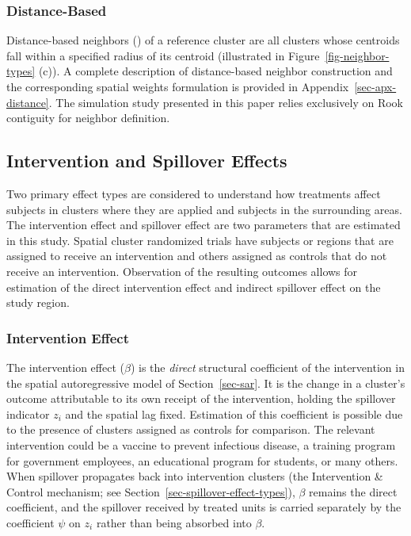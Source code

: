 \documentclass[
  12pt,
  prelim]{bios-prelim}
\begin{document}
\subsubsection{Distance-Based}\label{distance-based}

Distance-based neighbors
()
of a reference cluster are all clusters whose centroids fall within a
specified radius of its centroid (illustrated in
Figure~\ref{fig-neighbor-types} (c)). A complete description of
distance-based neighbor construction and the corresponding spatial
weights formulation is provided in Appendix~\ref{sec-apx-distance}. The
simulation study presented in this paper relies exclusively on Rook
contiguity for neighbor definition.

\subsection{Intervention and Spillover
Effects}\label{intervention-and-spillover-effects}

Two primary effect types are considered to understand how treatments
affect subjects in clusters where they are applied and subjects in the
surrounding areas. The intervention effect and spillover effect are two
parameters that are estimated in this study. Spatial cluster randomized
trials have subjects or regions that are assigned to receive an
intervention and others assigned as controls that do not receive an
intervention. Observation of the resulting outcomes allows for
estimation of the direct intervention effect and indirect spillover
effect on the study region.

\subsubsection{Intervention Effect}\label{sec-intervention-effect}

The intervention effect (\(\beta\)) is the \emph{direct} structural
coefficient of the intervention in the spatial autoregressive model of
Section~\ref{sec-sar}. It is the change in a cluster's outcome
attributable to its own receipt of the intervention, holding the
spillover indicator \(z_i\) and the spatial lag fixed. Estimation of
this coefficient is possible due to the presence of clusters assigned as
controls for comparison. The relevant intervention could be a vaccine to
prevent infectious disease, a training program for government employees,
an educational program for students, or many others. When spillover
propagates back into intervention clusters (the Intervention \& Control
mechanism; see Section~\ref{sec-spillover-effect-types}), \(\beta\)
remains the direct coefficient, and the spillover received by treated
units is carried separately by the coefficient \(\psi\) on \(z_i\)
rather than being absorbed into \(\beta\).
\end{document}
